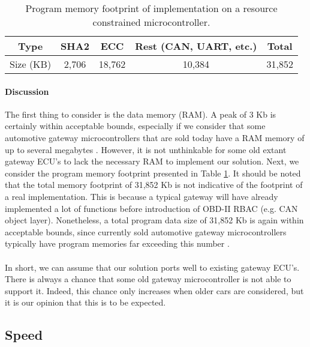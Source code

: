 \begin{table}[]
	\centering
	\begin{tabular}{|c|c|c|c||c|}
		\hline
		\rowcolor[HTML]{9B9B9B} Type & SHA2 & ECC & Rest (CAN, UART, etc.) & Total \\ \hline
		\cellcolor[HTML]{9B9B9B} Size (KB) & \cellcolor[HTML]{FFFFFF} 2,706 & 18,762 & 10,384 & 31,852 \\ \hline
	\end{tabular}
	\caption{Program memory footprint of implementation on a resource constrained microcontroller.}
	\label{table:portability}
\end{table}

\paragraph{Discussion} The first thing to consider is the data memory (RAM). A peak of 3 Kb is certainly within acceptable bounds, especially if we consider that some automotive gateway microcontrollers that are sold today have a RAM memory of up to several megabytes \cite{GatewayInfineon,GatewayST}. However, it is not unthinkable for some old extant gateway ECU's to lack the necessary RAM to implement our solution. Next, we consider the program memory footprint presented in Table \ref{table:portability}. It should be noted that the total memory footprint of 31,852 Kb is not indicative of the footprint of a real implementation. This is because a typical gateway will have already implemented a lot of functions before introduction of OBD-II RBAC (e.g. CAN object layer). Nonetheless, a total program data size of 31,852 Kb is again within acceptable bounds, since currently sold automotive gateway microcontrollers typically have program memories far exceeding this number \cite{GatewayInfineon,GatewayAtmel,GatewayST}. \\ \\ In short, we can assume that our solution ports well to existing gateway ECU's. There is always a chance that some old gateway microcontroller is not able to support it. Indeed, this chance only increases when older cars are considered, but it is our opinion that this is to be expected.  


\subsection{Speed}
\label{sec:speed}

